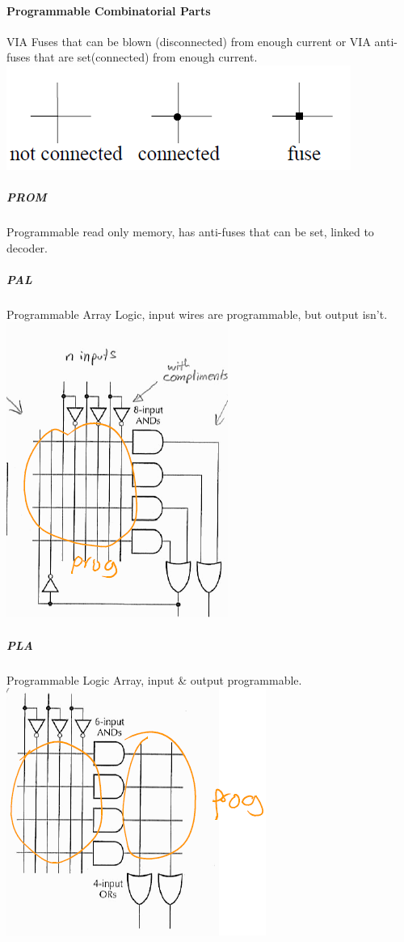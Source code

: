 \documentclass[12 pt]{article}
\begin{document}
	\paragraph{Programmable Combinatorial Parts} VIA Fuses that can be blown (disconnected) from enough current or VIA anti-fuses that are set(connected) from enough current. \\
	\includegraphics[scale=0.7]{fu}
	\subparagraph{PROM} Programmable read only memory, has anti-fuses that can be set, linked to decoder.
	\subparagraph{PAL} Programmable Array Logic, input wires are programmable, but output isn't.
	\includegraphics[scale=0.7]{pal}
	\subparagraph{PLA} Programmable Logic Array, input \& output programmable. 
	\includegraphics[scale=0.7]{pla}
\end{document}

